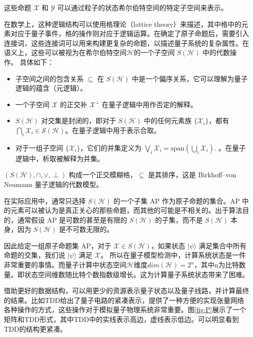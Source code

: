 这些命题 \( \mathcal{X} \) 和 \( \mathcal{Y} \) 可以通过粒子的状态希尔伯特空间的特定子空间来表示。

在数学上，这种逻辑结构可以使用格理论（lattice theory）来描述，其中格中的元素对应于量子事件，格的操作则对应于逻辑运算。在确定了原子命题后，需要引入连接词，这些连接词可以用来构建更复杂的命题，以描述量子系统的复杂属性。在语义上，这些可以被视为在希尔伯特空间$\mathcal{H}$的一个子空间 \(S(\mathcal{H})\) 中的代数操作。
具体如下：
\begin{itemize}
    \item 子空间之间的包含关系 \( \subseteq \) 在 \(S(\mathcal{H})\) 中是一个偏序关系，它可以理解为量子逻辑的蕴含（元逻辑）。
    \item 一个子空间 \( \mathcal{X} \) 的正交补 \( \mathcal{X}^\perp \) 在量子逻辑中用作否定的解释。
    \item \(S(\mathcal{H})\) 对交集是封闭的，即对于 \(S(\mathcal{H})\) 中的任何元素族 \( \{\mathcal{X}_i\} \)，都有$\bigcap_{i} \mathcal{X}_{i} \in \mathcal{S}(\mathcal{H})$。在量子逻辑中用于表示合取。
    \item 对于一组子空间 \(\{\mathcal{X}_i\}\)，它们的并集定义为
    \(
    \bigvee_i \mathcal{X}_i = \text{span} \left( \bigcup_i \mathcal{X}_i \right).
    \)
    。在量子逻辑中，析取被解释为并集。
\end{itemize}

\( (S(\mathcal{H}), \cap, \vee, \perp) \) 构成一个正交模糊格，\( \subseteq \) 是其排序，这是 Birkhoff–von Neumann 量子逻辑的代数模型。

在实际应用中，通常只选择 \( S(\mathcal{H}) \) 的一个子集 AP 作为原子命题的集合。AP 中的元素可以被认为是真正关心的那些命题，而其他的可能是不相关的。出于算法目的，通常假设 AP 是可数的甚至是有限的 \( S(\mathcal{H}) \) 的子集，而不是 \( S(\mathcal{H}) \) 本身，因为 \( S(\mathcal{H}) \) 是不可数无限的。

因此给定一组原子命题集 AP，对于 \( \mathcal{X} \in S(\mathcal{H}) \)，如果状态 \(|\psi\rangle\) 满足集合中所有命题的交集，我们说 \(|\psi\rangle\) 满足 \(\mathcal{X}\)。
所以在量子模型检测中，计算系统状态是一件非常重要的事情。而量子计算中状态空间\(\mathcal{H}\)维度\(dim\left(\mathcal{H}\right)=2^n\)，其中n为比特数量。即状态空间维数随比特个数指数级增长。这为计算量子系统状态带来了困难。

借助更好的数据结构，可以用更少的资源表示量子状态以及量子线路，并计算最终的结果。比如TDD给出了量子电路的紧凑表示，提供了一种方便的实现张量网络各种操作的方式，这些操作对于模拟量子物理系统非常重要。图\ref{fig:P}展示了一个矩阵和TDD形式，其中TDD中的实线表示高边，虚线表示低边。可以明显看到TDD的结构更紧凑。
 	 
